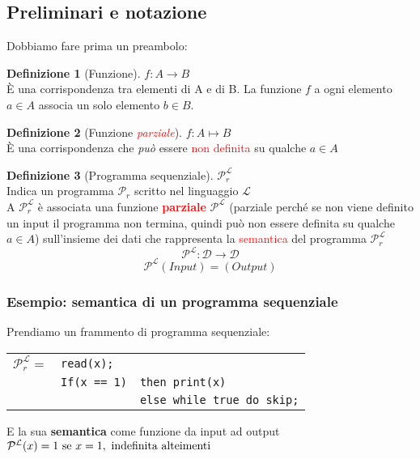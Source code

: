 \documentclass[a4paper,11pt,hidelinks]{book}
\theoremstyle{definition}
\newtheorem*{definizione}{Definizione}
\begin{document}
    \begin{mdframed}
    
    \section{Preliminari e notazione}
        Dobbiamo fare prima un preambolo:
        \begin{definizione}[Funzione]
            $f:A\longrightarrow B$ \\
            È una corrispondenza tra elementi di A e di B. La funzione $f$ a ogni elemento $a\in A$ associa un solo elemento $b\in B$.
        \end{definizione}
        \begin{definizione}[Funzione \textcolor{red}{\textit{parziale}}]
            $f:A \longmapsto B$ \\
            È una corrispondenza che \textit{può} essere \textcolor{red}{non definita} su qualche $a \in A$
        \end{definizione}
        \begin{definizione}[Programma sequenziale]
            $\mathcal{P}_r^\mathcal{L}$ \\
            Indica un programma $\mathcal{P}_r$ scritto nel linguaggio $\mathcal{L}$ \\
            A $\mathcal{P}_r^\mathcal{L}$ è associata una funzione \textcolor{red}{\textbf{parziale}} $\mathcal{P^L}$ (parziale perché se non viene definito un input il programma non termina, quindi può non essere definita su qualche $a \in A$) sull'insieme dei dati che rappresenta la \textcolor{red}{semantica} del programma $\mathcal{P}_r^\mathcal{L}$
            \[\mathcal{P^L}:\mathcal{D} \longrightarrow \mathcal{D}\]
            \[\mathcal{P^L}(Input)=(Output)\]
        \end{definizione}
        \subsubsection{Esempio: semantica di un programma sequenziale}
            Prendiamo un frammento di programma sequenziale: 
        
        \begin{center}
        \begin{tabular}{l l l}
            $\mathcal{P}_r^\mathcal{L}=$ & \verb|read(x);| & \\
             & \verb|If(x == 1)| & \verb|then print(x)| \\
             & & \verb|else while true do skip;| \\
        \end{tabular}
        \end{center}
        E la sua \textbf{semantica} come funzione da input ad output\\
        \(\mathcal{P^L}(x)=1 \textnormal{ se } x=1, \textnormal{ indefinita alteimenti}\)  \\
        \verb| |
        
    \end{mdframed}
    
\end{document}
